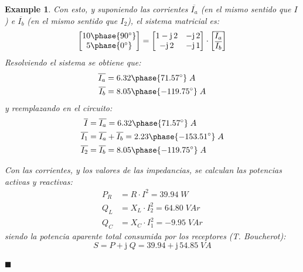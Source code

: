 \documentclass[11pt]{book} %
\numberwithin{dummy}{section}
\theoremstyle{ocrenumbox}
\theoremstyle{blacknumex}
\newtheorem{exampleT}{Example}[chapter]
\theoremstyle{blacknumbox}
\theoremstyle{ocrenum}
\newenvironment{example}{\begin{exampleT}}{\hfill{\tiny\ensuremath{\blacksquare}}\end{exampleT}}
\begin{document}
\begin{example}
		Con esto, y suponiendo las corrientes $\overline{I_a}$ (en el mismo sentido que $I$) e $\overline{I_b}$ (en el mismo sentido que $I_2$), el sistema matricial es: 
		\begin{equation*}
			\begin{bmatrix}
				10\phase{90^\circ} \\
				5\phase{0^\circ} 
			\end{bmatrix}
			=
			\begin{bmatrix}
				1-\mathrm{j}\,2 & -\mathrm{j}\,2 \\
				-\mathrm{j}\,2 & -\mathrm{j}\,1 \\
			\end{bmatrix}
			\cdot 
			\begin{bmatrix}
				\overline{I_a}\\
				\overline{I_b}
			\end{bmatrix}
		\end{equation*}
		Resolviendo el sistema se obtiene que:
		\begin{align*}
			\overline{I_a}&= 6.32\phase{71.57^\circ}\;A\\
			\overline{I_b}&= 8.05\phase{-119.75^\circ}\;A
		\end{align*}
		y reemplazando en el circuito: 
		\begin{align*}
			\overline{I}&=\overline{I_a}=6.32\phase{71.57^\circ}\;A\\
			\overline{I_1}&=\overline{I_a}+\overline{I_b}=2.23\phase{-153.51^\circ}\;A\\
			\overline{I_2}&=\overline{I_b}=8.05\phase{-119.75^\circ}\;A
		\end{align*}
		
		
		Con las corrientes, y los valores de las impedancias, se calculan las potencias activas y reactivas:
		\begin{align*}
			P_R&=R\cdot I^2=39.94\;W\\
			Q_L &= X_L\cdot I_2^2=64.80\;VAr\\
			Q_C&=X_C\cdot I_1^2=-9.95\;VAr
		\end{align*}
		siendo la potencia aparente total consumida por los receptores (T. Boucherot):
		\begin{equation*}
			S=P+\mathrm{j}\;Q=39.94+\mathrm{j}\,54.85\;VA
		\end{equation*}
		
		

\end{example}
\end{document}
